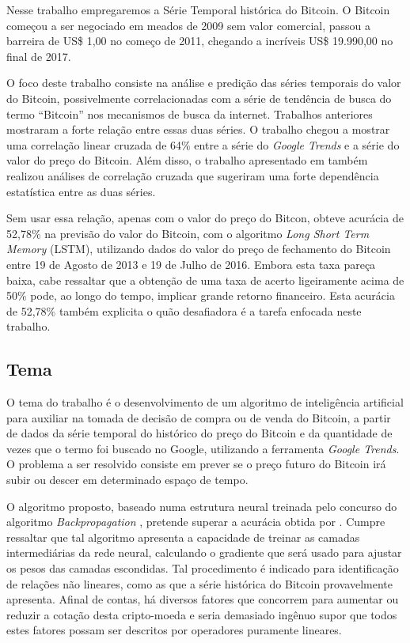 Nesse trabalho empregaremos a Série Temporal histórica do Bitcoin. O Bitcoin começou a ser negociado em meados de 2009 sem valor comercial, passou a barreira de US\$ 1,00 no começo de 2011, chegando a incríveis US\$ 19.990,00 no final de 2017.

O foco deste trabalho consiste na análise e predição das séries temporais do valor do Bitcoin, possivelmente correlacionadas com a série de tendência de busca do termo ``Bitcoin'' nos mecanismos de busca da internet. Trabalhos anteriores mostraram a forte relação entre essas duas séries. O trabalho \cite{matta2015bitcoin} chegou a mostrar uma  correlação linear cruzada de 64\% entre a série do \textit{Google Trends} e a série do valor do preço do Bitcoin. Além disso, o trabalho apresentado em \cite{wilson_yelowitz_2014} também realizou análises de correlação cruzada que sugeriram uma forte dependência estatística entre as duas séries.

Sem usar essa relação, apenas com o valor do preço do Bitcon, \cite{mcnally2016predicting} obteve acurácia de 52,78\% na previsão do valor do Bitcoin, com o algoritmo \textit{Long Short Term Memory} (LSTM), utilizando dados do valor do preço de fechamento do Bitcoin entre 19 de Agosto de 2013 e 19 de Julho de 2016. Embora esta taxa pareça baixa, cabe ressaltar que a obtenção de uma taxa de acerto ligeiramente acima de 50\% pode, ao longo do tempo, implicar grande retorno financeiro. Esta acurácia de 52,78\% também explicita o quão desafiadora é a tarefa enfocada neste trabalho.


\subsection{Tema}

O tema do trabalho é o desenvolvimento de um algoritmo de inteligência artificial para auxiliar na tomada de decisão de compra ou de venda do Bitcoin, a partir de dados da série temporal do histórico do preço do Bitcoin \cite{nakamoto2008bitcoin} e da quantidade de vezes que o termo foi buscado no Google, utilizando a ferramenta \textit{Google Trends}. O problema a ser resolvido consiste em prever se o preço futuro do Bitcoin irá subir ou descer em determinado espaço de tempo.

O algoritmo proposto, baseado numa estrutura neural treinada pelo concurso do algoritmo \emph{Backpropagation} \cite{hecht1992theory}, pretende superar a acurácia obtida por \cite{mcnally2016predicting}. Cumpre ressaltar que tal algoritmo apresenta a capacidade de treinar as camadas intermediárias da rede neural, calculando o gradiente que será usado para ajustar os pesos das camadas escondidas. Tal procedimento é indicado para identificação de relações não lineares, como as que a série histórica do Bitcoin provavelmente apresenta. Afinal de contas, há diversos fatores que concorrem para aumentar ou reduzir a cotação desta cripto-moeda e seria demasiado ingênuo supor que todos estes fatores possam ser descritos por operadores puramente lineares. 



